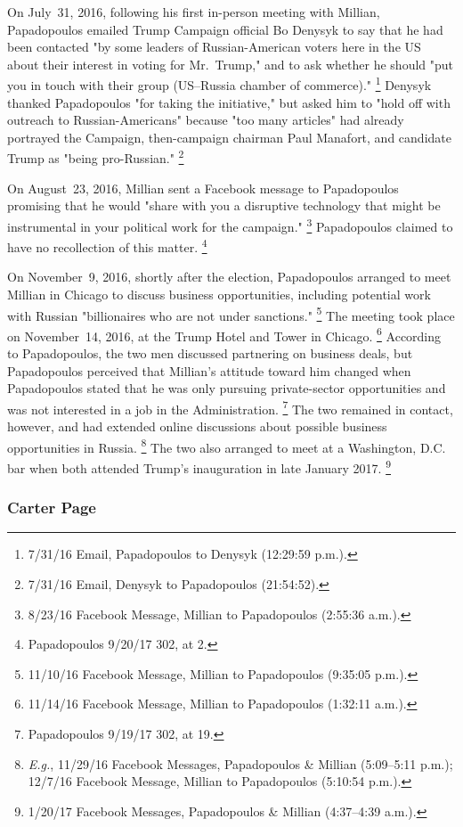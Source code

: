On July~31, 2016, following his first in-person meeting with Millian, Papadopoulos emailed Trump Campaign official Bo Denysyk to say that he had been contacted "by some leaders of Russian-American voters here in the US about their interest in voting for Mr.~Trump," and to ask whether he should "put you in touch with their group (US--Russia chamber of commerce)."%
\footnote{7/31/16 Email, Papadopoulos to Denysyk (12:29:59 p.m.).}
Denysyk thanked Papadopoulos "for taking the initiative," but asked him to "hold off with outreach to Russian-Americans" because "too many articles" had already portrayed the Campaign, then-campaign chairman Paul Manafort, and candidate Trump as "being pro-Russian."%
\footnote{7/31/16 Email, Denysyk to Papadopoulos (21:54:52).}

On August~23, 2016, Millian sent a Facebook message to Papadopoulos promising that he would "share with you a disruptive technology that might be instrumental in your political work for the campaign."%
\footnote{8/23/16 Facebook Message, Millian to Papadopoulos (2:55:36 a.m.).}
Papadopoulos claimed to have no recollection of this matter.%
\footnote{Papadopoulos 9/20/17 302, at 2.}

On November~9, 2016, shortly after the election, Papadopoulos arranged to meet Millian in Chicago to discuss business opportunities, including potential work with Russian "billionaires who are not under sanctions."%
\footnote{11/10/16 Facebook Message, Millian to Papadopoulos (9:35:05 p.m.).}
The meeting took place on November~14, 2016, at the Trump Hotel and Tower in Chicago.%
\footnote{11/14/16 Facebook Message, Millian to Papadopoulos (1:32:11 a.m.).}
According to Papadopoulos, the two men discussed partnering on business deals, but Papadopoulos perceived that Millian's attitude toward him changed when Papadopoulos stated that he was only pursuing private-sector opportunities and was not interested in a job in the Administration.%
\footnote{Papadopoulos 9/19/17 302, at 19.}
The two remained in contact, however, and had extended online discussions about possible business opportunities in Russia.%
\footnote{\textit{E.g.}, 11/29/16 Facebook Messages, Papadopoulos \& Millian (5:09--5:11 p.m.);
12/7/16 Facebook Message, Millian to Papadopoulos (5:10:54 p.m.).}
The two also arranged to meet at a Washington, D.C. bar when both attended Trump's inauguration in late January 2017.%
\footnote{1/20/17 Facebook Messages, Papadopoulos \& Millian (4:37--4:39 a.m.).}

\subsubsection{Carter Page}

